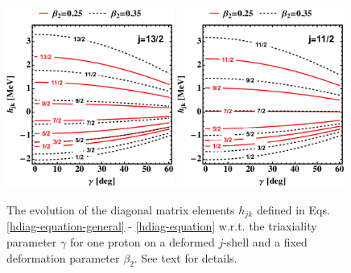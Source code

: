 \begin{figure}
    \centering
    \includegraphics[width=0.49\textwidth]{Chapters/Figures/hdiag-gamma-1.pdf}
    \includegraphics[width=0.49\textwidth]{Chapters/Figures/hdiag-gamma-2.pdf}
    \caption{The evolution of the diagonal matrix elements $h_{jk}$ defined in Eqs. \eqref{hdiag-equation-general} - \eqref{hdiag-equation} w.r.t. the triaxiality parameter $\gamma$ for one proton on a deformed $j$-shell and a fixed deformation parameter $\beta_2$. See text for details.}
    \label{hdiag-gamma-evolution}
\end{figure}

